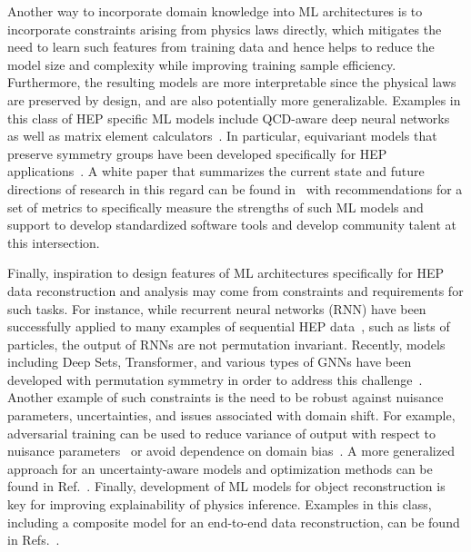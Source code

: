 \documentclass[submission,Phys]{SciPost}
\begin{document}
Another way to incorporate domain knowledge into ML architectures is to incorporate constraints arising from physics laws directly, which mitigates the need to learn such features from training data and hence helps to reduce the model size and complexity while improving training sample efficiency. Furthermore, the resulting models are more interpretable since the physical laws are preserved by design, and are also potentially more generalizable. Examples in this class of HEP specific ML models include QCD-aware deep neural networks~\cite{Louppe:2017ipp,Verma:2021ceh} as well as matrix element calculators~\cite{Maitre:2021uaa}. In particular, equivariant models that preserve symmetry groups have been developed specifically for HEP applications~\cite{cohen2016group,2019arXiv190204615C,Boyda:2020hsi,Favoni:2020reg,Dolan:2020qkr,Bulusu:2021rqz}.  A white paper that summarizes the current state and future directions of research in this regard can be found in~\cite{Bogatskiy:2022hub} with recommendations for a set of metrics to specifically measure the strengths of such ML models and support to develop standardized software tools and develop community talent at this intersection. 

Finally, inspiration to design features of ML architectures specifically for HEP data reconstruction and analysis may come from constraints and requirements for such tasks. For instance, while recurrent neural networks (RNN) have been successfully applied to many examples of sequential HEP data~\cite{Guest:2016iqz,Nguyen:2018ugw,Bols:2020bkb,goto2021development,deLima:2021fwm,ATL-PHYS-PUB-2017-003}, such as lists of particles, the output of RNNs are not permutation invariant. Recently, models including Deep Sets, Transformer, and various types of GNNs have been developed with permutation symmetry in order to address this challenge~\cite{Komiske:2018cqr,Qu:2019gqs,Mikuni:2020wpr,Shlomi:2020ufi,Dolan:2020qkr,Fenton:2020woz,Lee:2020qil,collado2021learning,Mikuni:2021pou,Shmakov:2021qdz,Shimmin:2021pkm,ATL-PHYS-PUB-2020-014}. Another example of such constraints is the need to be robust against nuisance parameters, uncertainties, and issues associated with domain shift. For example, adversarial training can be used to reduce variance of output with respect to nuisance parameters~\cite{Louppe:2016ylz} or avoid dependence on domain bias~\cite{Perdue_2018}. A more generalized approach for an uncertainty-aware models and optimization methods can be found in Ref.~\cite{Ghosh:2021roe}. Finally, development of ML models for object reconstruction is key for improving explainability of physics inference. Examples in this class, including a composite model for an end-to-end data reconstruction, can be found in Refs.~\cite{Drielsma:2021jdv,Pata:2021oez, MicroBooNE:2021nss,Hewes:2021heg,abbasi2021convolutional,Kieseler:2020wcq,Ju:2020xty}. 
\end{document}
